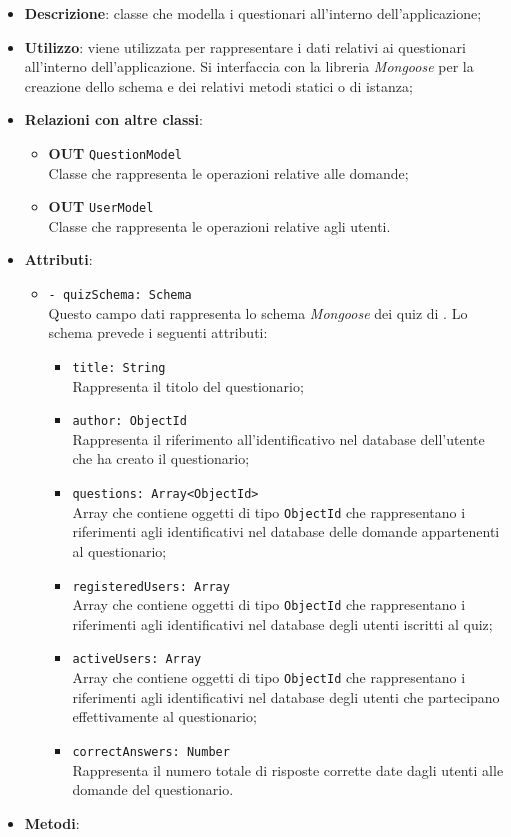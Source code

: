 \begin{itemize}
	\item \textbf{Descrizione}: classe che modella i questionari all'interno dell'applicazione;
	\item \textbf{Utilizzo}: viene utilizzata per rappresentare i dati relativi ai questionari all'interno dell'applicazione. Si interfaccia con la libreria \textit{Mongoose} per la creazione dello schema e dei relativi metodi statici o di istanza;
	\item \textbf{Relazioni con altre classi}:
		\begin{itemize}
			\item \textbf{OUT} \texttt{QuestionModel}\\
			Classe che rappresenta le operazioni relative alle domande;
			\item \textbf{OUT} \texttt{UserModel}\\
			Classe che rappresenta le operazioni relative agli utenti.
		\end{itemize}
	\item \textbf{Attributi}:
		\begin{itemize}
			\item \texttt{- quizSchema: Schema} \\
			Questo campo dati rappresenta lo schema \textit{Mongoose} dei quiz di \progetto. Lo schema prevede i seguenti attributi:
				\begin{itemize}
					\item \texttt{title: String}\\ Rappresenta il titolo del questionario;
					\item \texttt{author: ObjectId}\\ Rappresenta il riferimento all'identificativo nel database dell'utente che ha creato il questionario;
					\item \texttt{questions: Array<ObjectId>}\\ Array che contiene oggetti di tipo \texttt{ObjectId} che rappresentano i riferimenti agli identificativi nel database delle domande appartenenti al questionario;
					\item \texttt{registeredUsers: Array}\\ Array che contiene oggetti di tipo \texttt{ObjectId} che rappresentano i riferimenti agli identificativi nel database degli utenti iscritti al quiz;
					\item \texttt{activeUsers: Array}\\ Array che contiene oggetti di tipo \texttt{ObjectId} che rappresentano i riferimenti agli identificativi nel database degli utenti che partecipano effettivamente al questionario;
					\item \texttt{correctAnswers: Number}\\ Rappresenta il numero totale di risposte corrette date dagli utenti alle domande del questionario.	
				\end{itemize}
		\end{itemize}
	\item \textbf{Metodi}:
		\begin{itemize}
		

\end{itemize}
\end{itemize}
